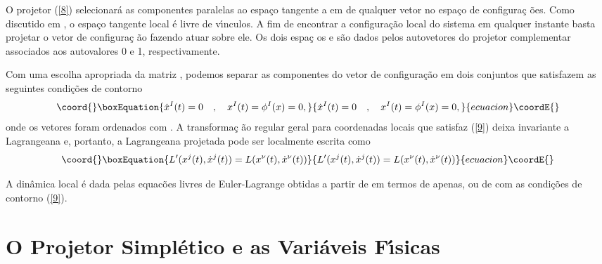 \documentclass[a4paper,thmsa,12pt]{report}
\begin{document}
O projetor (\ref{8}) selecionar\'{a} as componentes paralelas ao espa\c{c}o
tangente a \myHighlight{$\Sigma $}\coordHE{} em \coordHE{} de qualquer vetor no espa\c{c}o de configura\c{c}%
\~{o}es. Como discutido em \cite{cma}, o espa\c{c}o tangente local \'{e}
livre de v\'{\i}nculos. A fim de encontrar a configura\c{c}\~{a}o local do
sistema em qualquer instante \coordHE{} basta projetar o vetor de configura\c{c}%
\~{a}o \coordHE{} fazendo \myHighlight{$\Lambda $}\coordHE{} atuar sobre ele. Os dois espa\c{c}%
os \coordHE{} e \coordHE{} s\~{a}o dados pelos autovetores do projetor
complementar \coordHE{} associados aos autovalores 0 e 1,
respectivamente.

Com uma escolha apropriada da matriz \coordHE{}, podemos separar as
componentes do vetor de configura\c{c}\~{a}o em dois conjuntos \coordHE{} que satisfazem as seguintes condi\c{c}\~{o}es de
contorno \cite{cma} 
\begin{equation}\coord{}\boxEquation{
\dot{x}^{I}(t)=0~~~,~~~x^{I}(t)=\phi ^{I}(x)=0,  \label{9}
}{
\dot{x}^{I}(t)=0~~~,~~~x^{I}(t)=\phi ^{I}(x)=0,  }{ecuacion}\coordE{}\end{equation}
onde os vetores foram ordenados com \coordHE{}. A transforma\c{c}%
\~{a}o regular geral para coordenadas locais que satisfaz (\ref{9}) deixa
invariante a Lagrangeana e, portanto, a Lagrangeana projetada pode ser
localmente escrita como 
\begin{equation}\coord{}\boxEquation{
L^{\prime }(x^{j}(t),{\dot{x}}^{j}(t))=L(x^{\nu }(t),{\dot{x}}^{\nu }(t))
\label{10}
}{
L^{\prime }(x^{j}(t),{\dot{x}}^{j}(t))=L(x^{\nu }(t),{\dot{x}}^{\nu }(t))
}{ecuacion}\coordE{}\end{equation}

A din\^{a}mica local \'{e} dada pelas equac\~{o}es livres de Euler-Lagrange
obtidas a partir de \coordHE{} em termos de \coordHE{} apenas, ou de \coordHE{} com
as condi\c{c}\~{o}es de contorno (\ref{9}).

\section{{\sc O Projetor Simpl\'etico \myHighlight{$\Lambda $}\coordHE{} e as Vari\'aveis
F\'{\i}sicas}}
\end{document}
